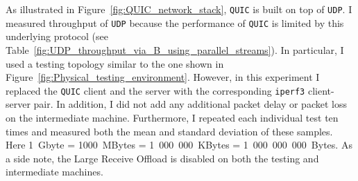 \documentclass[12pt,a4paper,twoside,openright]{report}
\begin{document}
As illustrated in Figure~\ref{fig:QUIC_network_stack}, \texttt{QUIC} is built on top of \texttt{UDP}.
I measured throughput of \texttt{UDP} because the performance of \texttt{QUIC} is limited by this underlying protocol (see Table~\ref{fig:UDP_throughput_via_B_using_parallel_streams}).
In particular, I used a testing topology similar to the one shown in  Figure~\ref{fig:Physical_testing_environment}.
However, in this experiment I replaced the \texttt{QUIC} client and the server with the corresponding \texttt{iperf3} client-server pair.
In addition, I did not add any additional packet delay or packet loss on the intermediate machine.
Furthermore, I repeated each individual test ten times and measured both the mean and standard deviation of these samples.
Here 1~Gbyte = 1000~MBytes = 1~000~000~KBytes = 1~000~000~000~Bytes.
As a side note, the Large Receive Offload is disabled on both the testing and intermediate machines.
\end{document}
